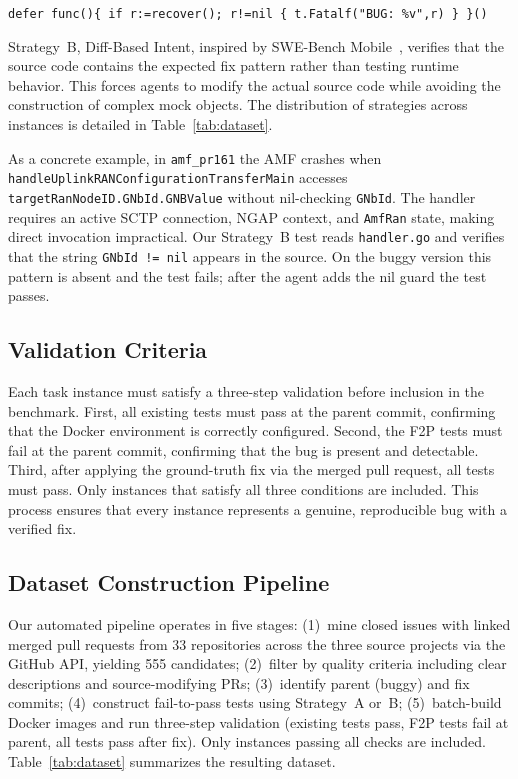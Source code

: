 \documentclass[10pt,conference]{IEEEtran}
\begin{document}
\vspace{2pt}
\noindent\texttt{\small defer func()\{ if r:=recover(); r!=nil \{ t.Fatalf("BUG: \%v",r) \} \}()}
\vspace{2pt}

Strategy~B, Diff-Based Intent, inspired by SWE-Bench Mobile~\cite{yao2025swebenchmobile}, verifies that the source code contains the expected fix pattern rather than testing runtime behavior. This forces agents to modify the actual source code while avoiding the construction of complex mock objects. The distribution of strategies across instances is detailed in Table~\ref{tab:dataset}.

As a concrete example, in \texttt{amf\_pr161} the AMF crashes when \texttt{handleUplinkRANConfigurationTransferMain} accesses \texttt{targetRanNodeID.GNbId.GNBValue} without nil-checking \texttt{GNbId}. The handler requires an active SCTP connection, NGAP context, and \texttt{AmfRan} state, making direct invocation impractical. Our Strategy~B test reads \texttt{handler.go} and verifies that the string \texttt{GNbId != nil} appears in the source. On the buggy version this pattern is absent and the test fails; after the agent adds the nil guard the test passes.

\subsection{Validation Criteria}

Each task instance must satisfy a three-step validation before inclusion in the benchmark. First, all existing tests must pass at the parent commit, confirming that the Docker environment is correctly configured. Second, the F2P tests must fail at the parent commit, confirming that the bug is present and detectable. Third, after applying the ground-truth fix via the merged pull request, all tests must pass. Only instances that satisfy all three conditions are included. This process ensures that every instance represents a genuine, reproducible bug with a verified fix.

\subsection{Dataset Construction Pipeline}

Our automated pipeline operates in five stages: (1)~mine closed issues with linked merged pull requests from 33 repositories across the three source projects via the GitHub API, yielding 555 candidates; (2)~filter by quality criteria including clear descriptions and source-modifying PRs; (3)~identify parent (buggy) and fix commits; (4)~construct fail-to-pass tests using Strategy~A or~B; (5)~batch-build Docker images and run three-step validation (existing tests pass, F2P tests fail at parent, all tests pass after fix). Only instances passing all checks are included. Table~\ref{tab:dataset} summarizes the resulting dataset.
\end{document}
